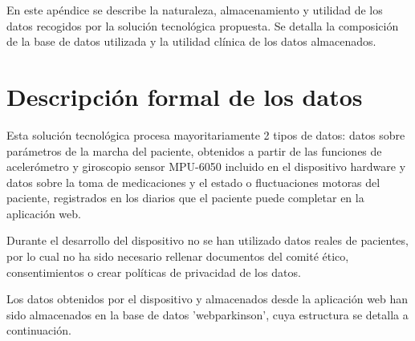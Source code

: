 En este apéndice se describe la naturaleza, almacenamiento y utilidad de los datos recogidos por la solución tecnológica propuesta. Se detalla la composición de la base de datos utilizada y la utilidad clínica de los datos almacenados.

\section{Descripción formal de los datos}
Esta solución tecnológica procesa mayoritariamente 2 tipos de datos: datos sobre parámetros de la marcha del paciente, obtenidos a partir de las funciones de acelerómetro y giroscopio sensor MPU-6050 incluido en el dispositivo hardware y datos sobre la toma de medicaciones y el estado o fluctuaciones motoras del paciente, registrados en los diarios que el paciente puede completar en la aplicación web.

Durante el desarrollo del dispositivo no se han utilizado datos reales de pacientes, por lo cual no ha sido necesario rellenar documentos del comité ético, consentimientos o crear políticas de privacidad de los datos.

Los datos obtenidos por el dispositivo y almacenados desde la aplicación web han sido almacenados en la base de datos 'webparkinson', cuya estructura se detalla a continuación.
